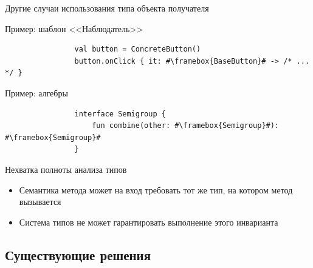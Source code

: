 \documentclass[usenames, dvipsnames]{beamer}
\begin{document}
    \begin{frame}[fragile]{Другие случаи использования типа объекта получателя}
        \begin{block}{Пример: шаблон <<Наблюдатель>>}
            \begin{verbatim}
                val button = ConcreteButton()
                button.onClick { it: #\framebox{BaseButton}# -> /* ... */ }
            \end{verbatim}
        \end{block}
        \begin{block}{Пример: алгебры}
            \begin{verbatim}
                interface Semigroup {
                    fun combine(other: #\framebox{Semigroup}#): #\framebox{Semigroup}#
                }
            \end{verbatim}
        \end{block}

        \begin{block}{Нехватка полноты анализа типов}
            \begin{itemize}
                \item Семантика метода может на вход требовать тот же тип, на котором метод вызывается
                \item Система типов не может гарантировать выполнение этого инварианта
            \end{itemize}
        \end{block}
    \end{frame}


    \subsection{Существующие решения}
\end{document}
